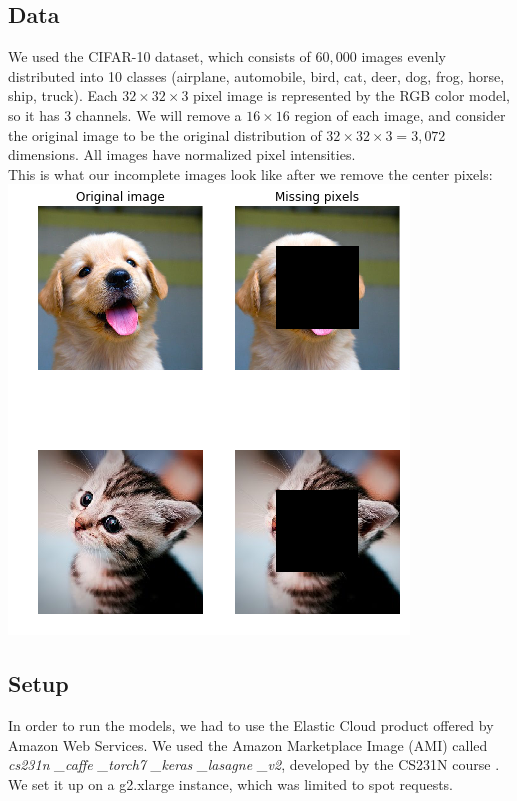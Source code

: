 \documentclass[10pt,twocolumn,letterpaper]{article}
\begin{document}
\subsection{Data}
We used the CIFAR-10 dataset, which consists of $60,000$ images evenly distributed into 10 classes (airplane, automobile, bird, cat, deer, dog, frog, horse, ship, truck). Each $32 \times 32 \times 3$ pixel image is represented by the RGB color model, so it has 3 channels. We will remove a $16 \times 16$ region of each image, and consider the original image to be the original distribution of $32 \times 32 \times 3 = 3,072$ dimensions. All images have normalized pixel intensities. \\

This is what our incomplete images look like after we remove the center pixels:
\includegraphics[width=1.0\linewidth]{img_sample.png}




\subsection{Setup}
In order to run the models, we had to use the Elastic Cloud product offered by Amazon Web Services. We used the Amazon Marketplace Image (AMI) called \textit{cs231n \_caffe \_torch7 \_keras \_lasagne \_v2}, developed by the CS231N course \cite{aws_tutorial}. We set it up on a g2.xlarge instance, which was limited to spot requests. 
\end{document}
